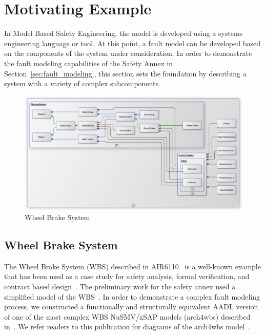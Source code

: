  \section{Motivating Example}
 
\label{sec:case_study} 
In Model Based Safety Engineering, the model is developed using a systems engineering language or tool. At this point, a fault model can be developed based on the components of the system under consideration. In order to demonstrate the fault modeling capabilities of the Safety Annex in Section~\ref{sec:fault_modeling}, this section sets the foundation by describing a system with a variety of complex subcomponents. 

\begin{figure}[h!]
	\centering
	\includegraphics[trim=0 9 0 5,clip,width=\textwidth]{images/wbs_arch.pdf}
	\caption{Wheel Brake System}
	\label{fig:wbs}
\end{figure} 

\subsection{Wheel Brake System}
The Wheel Brake System (WBS) described in AIR6110~\cite{AIR6110} is a well-known example that has been used as a case study for safety analysis, formal verification, and contract based design~\cite{DBLP:conf/cav/BozzanoCPJKPRT15, 10.1007/978-3-319-11936-6-7, CAV2015:BoCiGrMa, Joshi05:SafeComp}. The preliminary work for the safety annex used a simplified model of the WBS~\cite{Stewart17:IMBSA}. In order to demonstrate a complex fault modeling process, we constructed a functionally and structurally equivalent AADL version of one of the most complex WBS NuSMV/xSAP models (arch4wbs) described in~\cite{DBLP:conf/cav/BozzanoCPJKPRT15}. We refer readers to this publication for diagrams of the arch4wbs model~\cite{DBLP:conf/cav/BozzanoCPJKPRT15}.   

